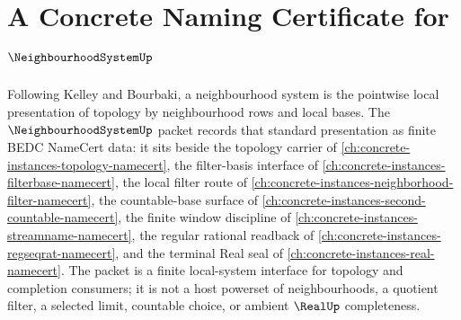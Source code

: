 \chapter{A Concrete Naming Certificate for $\NeighbourhoodSystemUp$}
\label{ch:concrete-instances-neighbourhood-system-namecert}

Following Kelley and Bourbaki, a neighbourhood system is the pointwise local presentation of topology by neighbourhood rows and local bases. The $\NeighbourhoodSystemUp$ packet records that standard presentation as finite BEDC NameCert data: it sits beside the topology carrier of \autoref{ch:concrete-instances-topology-namecert}, the filter-basis interface of \autoref{ch:concrete-instances-filterbase-namecert}, the local filter route of \autoref{ch:concrete-instances-neighborhood-filter-namecert}, the countable-base surface of \autoref{ch:concrete-instances-second-countable-namecert}, the finite window discipline of \autoref{ch:concrete-instances-streamname-namecert}, the regular rational readback of \autoref{ch:concrete-instances-regseqrat-namecert}, and the terminal Real seal of \autoref{ch:concrete-instances-real-namecert}. The packet is a finite local-system interface for topology and completion consumers; it is not a host powerset of neighbourhoods, a quotient filter, a selected limit, countable choice, or ambient $\RealUp$ completeness.

